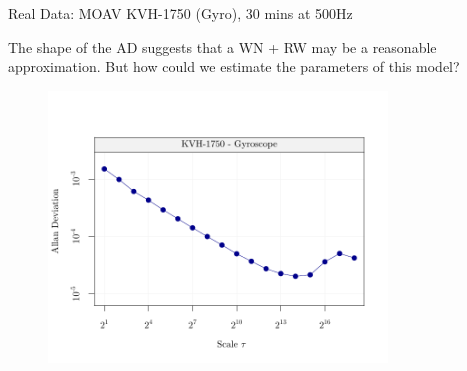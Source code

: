 \documentclass[envcountsect,usenames,dvipsnames]{beamer}
\theoremstyle{mystyle}
\begin{document}
\begin{frame}{Real Data: MOAV KVH-1750 (Gyro), 30 mins at 500Hz}

\begin{block}{ }
The shape of the AD suggests that a WN + RW may be a reasonable approximation. But how could we estimate the parameters of this model?
\end{block}

\vspace{-0.75cm}
    \begin{figure}
	    \centering
	  \includegraphics[width = 9cm]{Images/av_example_kvh.pdf}
	\end{figure}
\end{frame}

\end{document}
